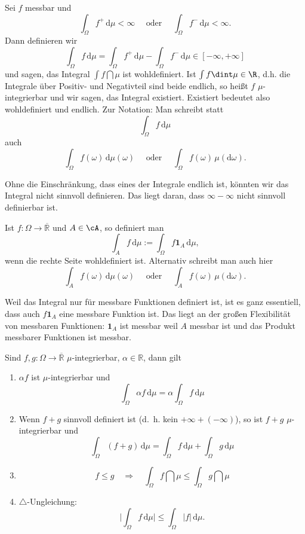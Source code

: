 \begin{deff}
	Sei $f$ messbar und \[ \int_{\Omega} f^+ \,\mathrm{d}\mu < \infty\quad \text{ oder }\quad\int_{\Omega} f^- \,\mathrm{d}\mu < \infty. \] Dann definieren wir
	\[ \int_{\Omega} f \,\mathrm{d}\mu = \int_{\Omega} f^+ \,\mathrm{d}\mu - \int_{\Omega} f^-\, \mathrm{d}\mu\in [-\infty,+\infty] \]
	und sagen, das Integral $\int f\dint \mu$ ist wohldefiniert. Ist $\int f \dint \mu \in \R$, d.h. die Integrale \"uber Positiv- und Negativteil sind beide endlich, so hei\ss t $f$ $\mu$-integrierbar und wir sagen, das Integral existiert. Existiert bedeutet also wohldefiniert und endlich. Zur Notation: Man schreibt statt \[ \int_{\Omega} f \,\mathrm{d}\mu \] auch
	\[ \int_{\Omega} f(\omega) \,\mathrm{d}\mu(\omega) \quad \text{ oder }\quad
	 \int_{\Omega} f(\omega)\, \mu(\mathrm{d}\omega). \]
\end{deff}
Ohne die Einschr\"ankung, dass eines der Integrale endlich ist, k\"onnten wir das Integral nicht sinnvoll definieren. Das liegt daran, dass $\infty-\infty$ nicht sinnvoll definierbar ist. 
\begin{deff}
	Ist $ f \! : \Omega \rightarrow \overline{\mathbb{R}}$ und $A \in \cA$, so definiert man 
	\[ \int_{A} f\, \mathrm{d}\mu := \int_{\Omega} f \mathbf{1}_A\, \mathrm{d}\mu, \]
	wenn die rechte Seite wohldefiniert ist. Alternativ schreibt man auch hier \[ \int_{A} f(\omega)\, \mathrm{d}\mu(\omega) \quad \text{ oder }\quad \int_{A} f(\omega) \,\mu(\mathrm{d}\omega). \]
\end{deff}
Weil das Integral nur f\"ur messbare Funktionen definiert ist, ist es ganz essentiell, dass auch $f \mathbf{1}_A$ eine messbare Funktion ist. Das liegt an der gro\ss en Flexibilit\"at von messbaren Funktionen: $\mathbf{1}_A$ ist messbar weil $A$ messbar ist und das Produkt messbarer Funktionen ist messbar.

\begin{lemma}
	Sind $ f, g \! : \Omega \rightarrow \overline{\mathbb{R}}$ $\mu$-integrierbar, $\alpha \in \mathbb{R}$, dann gilt 
	\begin{enumerate}[label=(\roman*)]
		\item $\alpha f$ ist $\mu$-integrierbar und \[ \int_{\Omega} \alpha f \,\mathrm{d}\mu = \alpha \int_{\Omega} f\, \mathrm{d}\mu \]
		\item Wenn $f+g$ sinnvoll definiert ist (\mbox{d. h.} kein $+\infty + (-\infty)$), so ist $f + g$ $\mu$-integrierbar und \[ \int_{\Omega} (f + g) \,\mathrm{d}\mu = \int_{\Omega} f \,\mathrm{d}\mu + \int_{\Omega} g\, \mathrm{d}\mu \]
		\item \[ f \leq g \quad \Rightarrow \quad \int_{\Omega} f \dint \mu \leq \int_{\Omega} g \dint \mu \]
		\item $\triangle$-Ungleichung: 
		\[ \Big|\int_{\Omega} f \,\mathrm{d}\mu\Big| \leq \int_{\Omega} |f| \,\mathrm{d}\mu. \]
	\end{enumerate}
\end{lemma}

